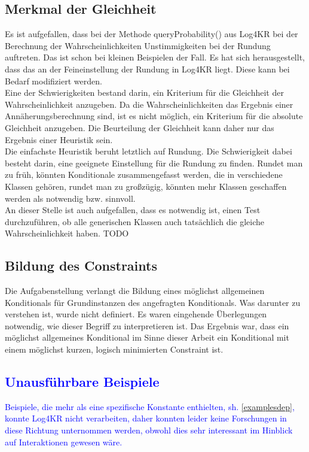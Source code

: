 \documentclass[a4paper, 11pt]{book}
\begin{document}
\subsection{Merkmal der Gleichheit} \label{Gleichheit}
Es ist aufgefallen, dass bei der Methode queryProbability() aus Log4KR bei der Berechnung der Wahrscheinlichkeiten Unstimmigkeiten bei der Rundung auftreten. Das ist schon bei kleinen Beispielen der Fall. Es hat sich herausgestellt, dass das an der Feineinstellung der Rundung in Log4KR liegt. Diese kann bei Bedarf modifiziert werden.\\
Eine der Schwierigkeiten bestand darin, ein Kriterium für die Gleichheit der Wahrscheinlichkeit anzugeben. Da die Wahrscheinlichkeiten das Ergebnis einer Annäherungsberechnung sind, ist es nicht möglich, ein Kriterium für die absolute Gleichheit anzugeben. Die Beurteilung der Gleichheit kann daher nur das Ergebnis einer Heuristik sein.\\
Die einfachste Heuristik beruht letztlich auf Rundung. Die Schwierigkeit dabei besteht darin, eine geeignete Einstellung für die Rundung zu finden. Rundet man zu früh, könnten Konditionale zusammengefasst werden, die in verschiedene Klassen gehören, rundet man zu großzügig, könnten mehr Klassen geschaffen werden als notwendig bzw. sinnvoll.\\
An dieser Stelle ist auch aufgefallen, dass es notwendig ist, einen Test durchzuführen, ob alle generischen Klassen auch tatsächlich die gleiche Wahrscheinlichkeit haben. TODO

\subsection{Bildung des Constraints}
Die Aufgabenstellung verlangt die Bildung eines möglichst allgemeinen Konditionals für Grundinstanzen des angefragten Konditionals. Was darunter zu verstehen ist, wurde nicht definiert. Es waren eingehende Überlegungen notwendig, wie dieser Begriff zu interpretieren ist. Das Ergebnis war, dass ein möglichst allgemeines Konditional im Sinne dieser Arbeit ein Konditional mit einem möglichst kurzen, logisch minimierten Constraint ist.

\textcolor{blue}{
\subsection{Unausführbare Beispiele} \label{Beispiele unausfuehrbar} 
Beispiele, die mehr als eine spezifische Konstante  enthielten, sh. \ref{examplesdep}, konnte Log4KR nicht verarbeiten, daher konnten leider keine Forschungen in diese Richtung unternommen werden, obwohl dies sehr interessant im Hinblick auf Interaktionen gewesen wäre. 
}
\end{document}
